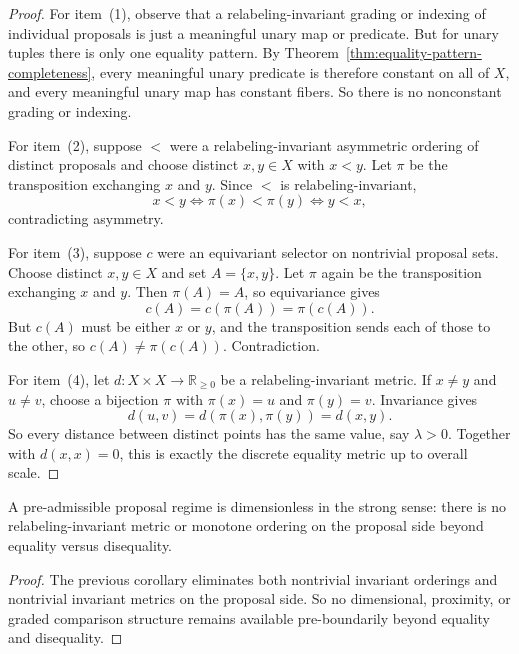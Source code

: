 \begin{proof}
For item~(1), observe that a relabeling-invariant grading or indexing of individual proposals is just a meaningful unary map or predicate. But for unary tuples there is only one equality pattern. By Theorem~\ref{thm:equality-pattern-completeness}, every meaningful unary predicate is therefore constant on all of $X$, and every meaningful unary map has constant fibers. So there is no nonconstant grading or indexing.

For item~(2), suppose $<$ were a relabeling-invariant asymmetric ordering of distinct proposals and choose distinct $x,y\in X$ with $x<y$. Let $\pi$ be the transposition exchanging $x$ and $y$. Since $<$ is relabeling-invariant,
\[
  x<y \iff \pi(x)<\pi(y) \iff y<x,
\]
contradicting asymmetry.

For item~(3), suppose $c$ were an equivariant selector on nontrivial proposal sets. Choose distinct $x,y\in X$ and set $A=\{x,y\}$. Let $\pi$ again be the transposition exchanging $x$ and $y$. Then $\pi(A)=A$, so equivariance gives
\[
  c(A)=c(\pi(A))=\pi(c(A)).
\]
But $c(A)$ must be either $x$ or $y$, and the transposition sends each of those to the other, so $c(A)\neq \pi(c(A))$. Contradiction.

For item~(4), let $d:X\times X\to \mathbb R_{\ge 0}$ be a relabeling-invariant metric. If $x\neq y$ and $u\neq v$, choose a bijection $\pi$ with $\pi(x)=u$ and $\pi(y)=v$. Invariance gives
\[
  d(u,v)=d(\pi(x),\pi(y))=d(x,y).
\]
So every distance between distinct points has the same value, say $\lambda>0$. Together with $d(x,x)=0$, this is exactly the discrete equality metric up to overall scale.\cite{MaleyAMetric,MaleyNecessity}
\end{proof}

\begin{corollary}
A pre-admissible proposal regime is dimensionless in the strong sense: there is no relabeling-invariant metric or monotone ordering on the proposal side beyond equality versus disequality.
\end{corollary}

\begin{proof}
The previous corollary eliminates both nontrivial invariant orderings and nontrivial invariant metrics on the proposal side. So no dimensional, proximity, or graded comparison structure remains available pre-boundarily beyond equality and disequality.\cite{MaleyAMetric,MaleyNecessity}
\end{proof}

